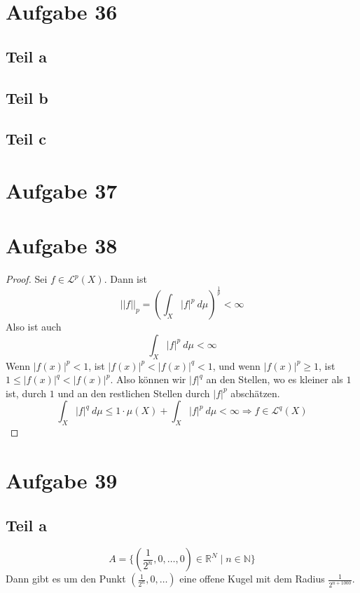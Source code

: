\documentclass[10pt,a4paper]{article}
\begin{document}
\section{Aufgabe 36}

\subsection{Teil a}

\subsection{Teil b}

\subsection{Teil c}

\section{Aufgabe 37}

\section{Aufgabe 38}
\begin{proof}
  Sei $f \in \mathscr{L}^{p}(X)$.
  Dann ist
  \begin{equation}
    ||f||_{p} = \left( \int_{X} |f|^{p}\ d\mu \right)^{\frac{1}{p}} < \infty
  \end{equation}
  Also ist auch
  \begin{equation}
    \int_{X} |f|^{p}\ d\mu < \infty
  \end{equation}
  Wenn $|f(x)|^{p} < 1$, ist $|f(x)|^{p} < |f(x)|^{q} < 1$, und wenn $|f(x)|^{p} \ge 1$, ist $1 \le |f(x)|^{q} < |f(x)|^{p}$.
  Also können wir $|f|^{q}$ an den Stellen, wo es kleiner als $1$ ist, durch $1$ und an den restlichen Stellen durch $|f|^{p}$ abschätzen.
  \begin{equation}
    \int_{X} |f|^{q}\ d\mu \le 1 \cdot \mu(X) + \int_{X} |f|^{p}\ d\mu < \infty \Rightarrow f \in \mathscr{L}^{q}(X)
  \end{equation}
\end{proof}

\section{Aufgabe 39}

\subsection{Teil a}
\begin{equation}
  A = \{ (\frac{1}{2^{n}}, 0, \dots, 0) \in \mathbb{R}^{N} \mid n \in \mathbb{N} \}
\end{equation}
Dann gibt es um den Punkt $(\frac{1}{2^{n}}, 0, \dots)$ eine offene Kugel mit dem Radius $\frac{1}{2^{n + 1000}}$.
\end{document}
